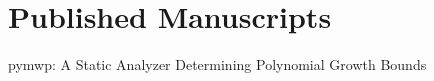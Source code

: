 \section{Published Manuscripts}
\label{sec:published-manuscripts}

\begin{description}
    \item pymwp: A Static Analyzer Determining Polynomial Growth Bounds
\end{description}

\pagebreak


